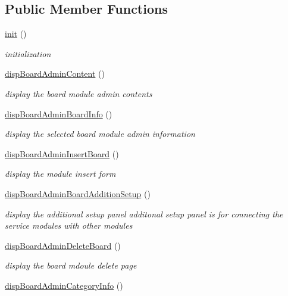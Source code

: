 \subsection*{Public Member Functions}
\begin{DoxyCompactItemize}
\item 
\hyperlink{classboardAdminView_ac0c66d07632b7766e07543149e0b8cc5}{init} ()
\begin{DoxyCompactList}\small\item\em initialization \end{DoxyCompactList}\item 
\hyperlink{classboardAdminView_a9e8c74683b01595dc6dafa5f2f41dd53}{disp\-Board\-Admin\-Content} ()
\begin{DoxyCompactList}\small\item\em display the board module admin contents \end{DoxyCompactList}\item 
\hyperlink{classboardAdminView_a3712817f1117103b470796946abc62a4}{disp\-Board\-Admin\-Board\-Info} ()
\begin{DoxyCompactList}\small\item\em display the selected board module admin information \end{DoxyCompactList}\item 
\hyperlink{classboardAdminView_a823448c68fe8c5d8f13b1854f6478c0d}{disp\-Board\-Admin\-Insert\-Board} ()
\begin{DoxyCompactList}\small\item\em display the module insert form \end{DoxyCompactList}\item 
\hyperlink{classboardAdminView_a684dcfc8eba6453f2de80730f32f364f}{disp\-Board\-Admin\-Board\-Addition\-Setup} ()
\begin{DoxyCompactList}\small\item\em display the additional setup panel additonal setup panel is for connecting the service modules with other modules \end{DoxyCompactList}\item 
\hyperlink{classboardAdminView_a6db8342036e86100dd74b2af2e027a6f}{disp\-Board\-Admin\-Delete\-Board} ()
\begin{DoxyCompactList}\small\item\em display the board mdoule delete page \end{DoxyCompactList}\item 
\hyperlink{classboardAdminView_a53544e00aae20f5b0dfa86f15cc1895b}{disp\-Board\-Admin\-Category\-Info} ()

\end{DoxyCompactItemize}
